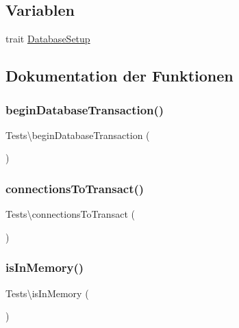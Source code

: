 \subsection*{Variablen}
\begin{DoxyCompactItemize}
\item 
trait \hyperlink{namespaceTests_a61a1f8e81d061aa7cd42fb96f6c98929}{Database\+Setup}
\end{DoxyCompactItemize}


\subsection{Dokumentation der Funktionen}
\mbox{\label{namespaceTests_aeae90ed4a61f6fdbfb44b913099c2773}} 
\subsubsection{\texorpdfstring{begin\+Database\+Transaction()}{beginDatabaseTransaction()}}
{\footnotesize\ttfamily Tests\textbackslash{}begin\+Database\+Transaction (\begin{DoxyParamCaption}{ }\end{DoxyParamCaption})}

\mbox{\label{namespaceTests_a3f50d9094b746f372c784950c0eaf1a0}} 
\subsubsection{\texorpdfstring{connections\+To\+Transact()}{connectionsToTransact()}}
{\footnotesize\ttfamily Tests\textbackslash{}connections\+To\+Transact (\begin{DoxyParamCaption}{ }\end{DoxyParamCaption})\hspace{0.3cm}{\ttfamily [protected]}}

\mbox{\label{namespaceTests_a6d14bd4b535e21847e4506fbcba3e4d5}} 
\subsubsection{\texorpdfstring{is\+In\+Memory()}{isInMemory()}}
{\footnotesize\ttfamily Tests\textbackslash{}is\+In\+Memory (\begin{DoxyParamCaption}{ }\end{DoxyParamCaption})\hspace{0.3cm}{\ttfamily [protected]}}


